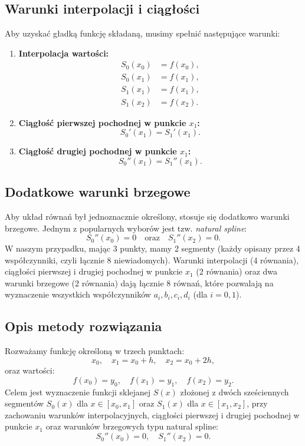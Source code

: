 \documentclass{article}
\begin{document}
\subsection{Warunki interpolacji i ciągłości}
Aby uzyskać gładką funkcję składaną, musimy spełnić następujące warunki:
\begin{enumerate}
    \item \textbf{Interpolacja wartości:}
    \begin{align*}
        S_0(x_0) &= f(x_0),\\[1mm]
        S_0(x_1) &= f(x_1),\\[1mm]
        S_1(x_1) &= f(x_1),\\[1mm]
        S_1(x_2) &= f(x_2).
    \end{align*}
    \item \textbf{Ciągłość pierwszej pochodnej w punkcie \( x_1 \):}
    \[
    S_0'(x_1)=S_1'(x_1).
    \]
    \item \textbf{Ciągłość drugiej pochodnej w punkcie \( x_1 \):}
    \[
    S_0''(x_1)=S_1''(x_1).
    \]
\end{enumerate}

\subsection{Dodatkowe warunki brzegowe}
Aby układ równań był jednoznacznie określony, stosuje się dodatkowo warunki brzegowe. Jednym z popularnych wyborów jest tzw. \emph{natural spline}:
\[
S_0''(x_0)=0 \quad \text{oraz} \quad S_1''(x_2)=0.
\]
W naszym przypadku, mając 3 punkty, mamy 2 segmenty (każdy opisany przez 4 współczynniki, czyli łącznie 8 niewiadomych). Warunki interpolacji (4 równania), ciągłości pierwszej i drugiej pochodnej w punkcie \( x_1 \) (2 równania) oraz dwa warunki brzegowe (2 równania) dają łącznie 8 równań, które pozwalają na wyznaczenie wszystkich współczynników \( a_i, b_i, c_i, d_i \) (dla \( i=0,1 \)).

\subsection{Opis metody rozwiązania}
Rozważamy funkcję określoną w trzech punktach:
\[
x_0,\quad x_1=x_0+h,\quad x_2=x_0+2h,
\]
oraz wartości:
\[
f(x_0)=y_0,\quad f(x_1)=y_1,\quad f(x_2)=y_2.
\]
Celem jest wyznaczenie funkcji sklejanej \(S(x)\) złożonej z dwóch sześciennych segmentów \(S_0(x)\) dla \(x\in[x_0,x_1]\) oraz \(S_1(x)\) dla \(x\in[x_1,x_2]\), przy zachowaniu warunków interpolacyjnych, ciągłości pierwszej i drugiej pochodnej w punkcie \(x_1\) oraz warunków brzegowych typu natural spline:
\[
S_0''(x_0)=0,\quad S_1''(x_2)=0.
\]
\end{document}

